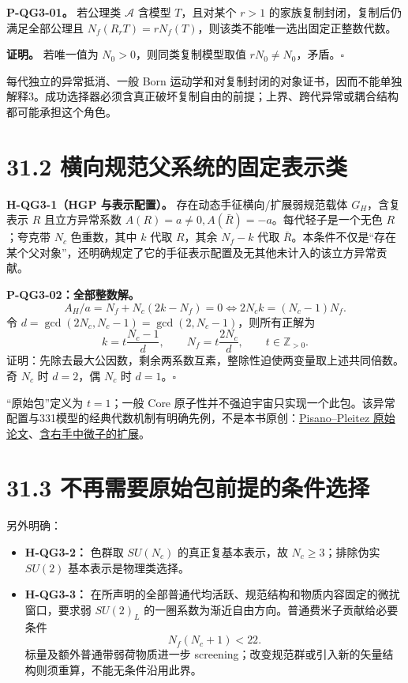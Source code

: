 \documentclass[
  11pt,
  oneside]{book}
\providecommand{\tightlist}{%
  \setlength{\itemsep}{0pt}\setlength{\parskip}{0pt}}
\begin{document}
\protect\hypertarget{p-qg3-01}{}{}

\textbf{P-QG3-01。} 若公理类 \(\mathcal A\) 含模型 \(T\)，且对某个
\(r>1\) 的家族复制封闭，复制后仍满足全部公理且
\(N_f(R_rT)=rN_f(T)\)，则该类不能唯一选出固定正整数代数。

\textbf{证明。} 若唯一值为 \(N_0>0\)，则同类复制模型取值
\(rN_0\ne N_0\)，矛盾。\(\square\)

每代独立的异常抵消、一般 Born
运动学和对复制封闭的对象证书，因而不能单独解释3。成功选择器必须含真正破坏复制自由的前提；上界、跨代异常或耦合结构都可能承担这个角色。

\section{31.2 横向规范父系统的固定表示类}

\textbf{H-QG3-1（HGP 与表示配置）。} 存在动态手征横向/扩展弱规范载体
\(G_H\)，含复表示 \(R\) 且立方异常系数
\(A(R)=a\ne0,A(\bar R)=-a\)。每代轻子是一个无色 \(R\)；夸克带 \(N_c\)
色重数，其中 \(k\) 代取 \(R\)，其余 \(N_f-k\) 代取
\(\bar R\)。本条件不仅是``存在某个父对象''，还明确规定了它的手征表示配置及无其他未计入的该立方异常贡献。

\protect\hypertarget{p-qg3-02}{}{}

\textbf{P-QG3-02：全部整数解。} \[
A_H/a=N_f+N_c(2k-N_f)=0
\iff 2N_ck=(N_c-1)N_f.
\] 令 \(d=\gcd(2N_c,N_c-1)=\gcd(2,N_c-1)\)，则所有正解为 \[
k=t\frac{N_c-1}{d},\qquad N_f=t\frac{2N_c}{d},\qquad
t\in\mathbb Z_{>0}.
\]
证明：先除去最大公因数，剩余两系数互素，整除性迫使两变量取上述共同倍数。奇
\(N_c\) 时 \(d=2\)，偶 \(N_c\) 时 \(d=1\)。\(\square\)

``原始包''定义为 \(t=1\)；一般 Core
原子性并不强迫宇宙只实现一个此包。该异常配置与331模型的经典代数机制有明确先例，不是本书原创：\href{https://arxiv.org/abs/hep-ph/9206242}{Pisano--Pleitez
原始论文}、\href{https://link.aps.org/doi/10.1103/PhysRevD.50.R34}{含右手中微子的扩展}。

\section{31.3 不再需要原始包前提的条件选择}

另外明确：

\begin{itemize}
\tightlist
\item
  \textbf{H-QG3-2：} 色群取 \(SU(N_c)\) 的真正复基本表示，故
  \(N_c\ge3\)；排除伪实 \(SU(2)\) 基本表示是物理类选择。
\item
  \textbf{H-QG3-3：}
  在所声明的全部普通代均活跃、规范结构和物质内容固定的微扰窗口，要求弱
  \(SU(2)_L\) 的一圈系数为渐近自由方向。普通费米子贡献给必要条件 \[
  N_f(N_c+1)<22.
  \] 标量及额外普通带弱荷物质进一步
  screening；改变规范群或引入新的矢量结构则须重算，不能无条件沿用此界。
\end{itemize}
\end{document}
